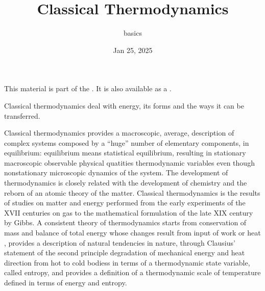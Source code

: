 \documentclass[letterpaper,10pt,english]{jupyterBook}
\title{Classical Thermodynamics}
\date{Jan 25, 2025}
\author{basics}
\begin{document}
\pagestyle{empty}
\sphinxmaketitle
\pagestyle{plain}
\sphinxtableofcontents
\pagestyle{normal}
\label{\detokenize{intro::doc}}


\sphinxAtStartPar
This material is part of the . It is also available as a .

\sphinxAtStartPar
Classical thermodynamics deal with energy, its forms and the ways it can be transferred.

\sphinxAtStartPar
Classical thermodynamics provides a macroscopic, average, description of complex systems composed by a “huge” number of elementary components, in equilibrium: equilibrium means statistical equilibrium, resulting in stationary macroscopic observable physical quatities \sphinxhyphen{} thermodynamic variables \sphinxhyphen{} even though non\sphinxhyphen{}stationary microscopic dynamics of the system. The development of thermodynamics is closely related with the development of chemistry and the re\sphinxhyphen{}born of an atomic theory of the matter. Classical thermodynamics is the results of studies on matter and energy performed from the early experiments of the XVII centuries on gas to the mathematical formulation of the late XIX century by Gibbs. A consistent theory of thermodynamics starts from conservation of mass and balance of total energy \sphinxhyphen{} whose changes result from input of work or heat \sphinxhyphen{}, provides a description of natural tendencies in nature, through Clausius’ statement of the second principle \sphinxhyphen{} degradation of mechanical energy and heat direction from hot to cold bodiess \sphinxhyphen{} in terms of a thermodynamic state variable, called entropy, and provides a definition of a thermodynamic scale of temperature \sphinxhyphen{} defined in terms of energy and entropy.



\sphinxstepscope
\end{document}
